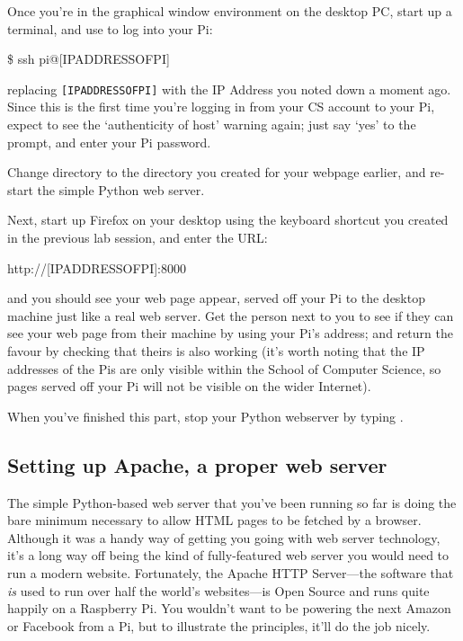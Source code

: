 Once you're in the graphical window environment on the desktop PC,
start up a terminal, and use  to log into your Pi:

\begin{ttoutenv}
\$ ssh pi@[IPADDRESSOFPI]
\end{ttoutenv}

replacing \verb+[IPADDRESSOFPI]+ with the IP Address you noted down a moment
ago. Since this is the first time you're logging in from your CS
account to your Pi, expect to see the `authenticity of host'
warning again; just say `yes' to the prompt, and enter your Pi
password.

Change directory to the  directory you created for
your webpage earlier, and re-start the simple Python web server.

Next, start up Firefox on your desktop using the keyboard shortcut you
created in the previous lab session, and enter the URL:

\begin{ttoutenv}
http://[IPADDRESSOFPI]:8000
\end{ttoutenv}

and you should see your web page appear, served off your Pi to the
desktop machine just like a real web server. Get the person next to
you to see if they can see your web page from their machine by using
your Pi's address; and return the favour by checking that theirs is
also working (it's worth noting that the IP addresses of the Pis are
only visible within the School of Computer Science, so pages served
off your Pi will not be visible on the wider Internet).

When you've finished this part, stop your Python webserver by typing
.

\subsection{Setting up Apache, a proper web server}

The simple Python-based web server that you've been running so far is
doing the bare minimum necessary to allow HTML pages to be fetched by
a browser. Although it was a handy way of getting you going with web
server technology, it's a long way off being the kind of
fully-featured web server you would need to run a modern
website. Fortunately, the Apache HTTP Server---the software that
\textit{is} used to run over half the world's websites---is Open
Source and runs quite happily on a Raspberry Pi. You wouldn't want to
be powering the next Amazon or Facebook from a Pi, but to illustrate the
principles, it'll do the job nicely.

